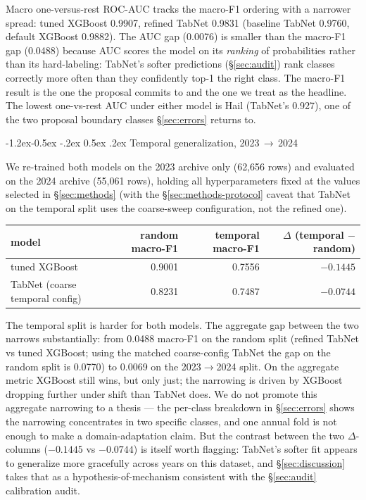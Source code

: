 \documentclass[11pt]{article}
\makeatletter
\renewcommand\subsection{\@startsection{subsection}{2}{\z@}%
  {-1.2ex\@plus -0.5ex \@minus -.2ex}%
  {0.5ex \@plus .2ex}%
  {\normalfont\normalsize\bfseries}}
\newcommand{\mF}{macro-F1}
\makeatother
\begin{document}
Macro one-versus-rest ROC-AUC tracks the \mF{} ordering with a
narrower spread: tuned XGBoost 0.9907, refined TabNet 0.9831
(baseline TabNet 0.9760, default XGBoost 0.9882). The AUC gap
(0.0076) is smaller than the \mF{} gap (0.0488) because AUC scores
the model on its \emph{ranking} of probabilities rather than its
hard-labeling: TabNet's softer predictions (\S\ref{sec:audit}) rank
classes correctly more often than they confidently top-1 the right
class. The \mF{} result is the one the proposal commits to and the
one we treat as the headline. The lowest one-vs-rest AUC under
either model is Hail (TabNet's 0.927), one of the two proposal
boundary classes \S\ref{sec:errors} returns to.

\subsection{Temporal generalization, 2023\,$\rightarrow$\,2024}\label{sec:exp-temporal}

We re-trained both models on the 2023 archive only (62{,}656 rows)
and evaluated on the 2024 archive (55{,}061 rows), holding all
hyperparameters fixed at the values selected in
\S\ref{sec:methods} (with the \S\ref{sec:methods-protocol} caveat
that TabNet on the temporal split uses the coarse-sweep
configuration, not the refined one).

\begin{center}
\small
\begin{tabular}{lrrr}
\toprule
model & random \mF{} & temporal \mF{} & $\Delta$ (temporal $-$ random) \\
\midrule
tuned XGBoost                       & 0.9001 & 0.7556 & $-0.1445$ \\
TabNet (coarse temporal config)     & 0.8231 & 0.7487 & $-0.0744$ \\
\bottomrule
\end{tabular}
\end{center}

The temporal split is harder for both models. The aggregate gap
between the two narrows substantially: from 0.0488 \mF{} on the
random split (refined TabNet vs tuned XGBoost; using the
matched coarse-config TabNet the gap on the random split is 0.0770)
to 0.0069 on the 2023$\rightarrow$2024 split. On the aggregate
metric XGBoost still wins, but only just; the narrowing is driven by
XGBoost dropping further under shift than TabNet does. We do not
promote this aggregate narrowing to a thesis --- the per-class
breakdown in \S\ref{sec:errors} shows the narrowing concentrates in
two specific classes, and one annual fold is not enough to make a
domain-adaptation claim. But the contrast between the two
$\Delta$-columns ($-0.1445$ vs $-0.0744$) is itself worth flagging:
TabNet's softer fit appears to generalize more gracefully across
years on this dataset, and \S\ref{sec:discussion} takes that as a
hypothesis-of-mechanism consistent with the \S\ref{sec:audit}
calibration audit.
\end{document}
